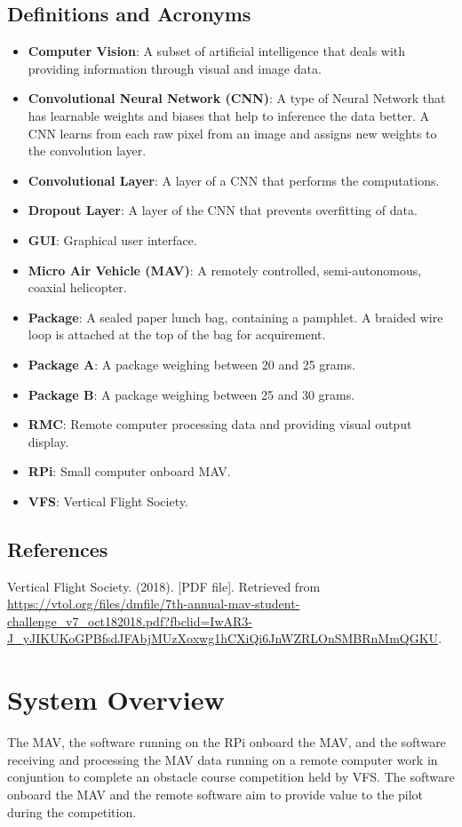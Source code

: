 \documentclass[onecolumn, oneside, letterpaper, draftclsnofoot, 10pt, compsoc]{IEEEtran}
\begin{document}
\subsection{Definitions and Acronyms}
\begin{itemize}
\item \textbf{Computer Vision}: A subset of artificial intelligence that deals with providing information through visual and image data.
\item \textbf{Convolutional Neural Network (CNN)}: A type of Neural Network that has learnable weights and biases that help to inference the data better. A CNN learns from each raw pixel from an image and assigns new weights to the convolution layer.
\item \textbf{Convolutional Layer}: A layer of a CNN that performs the computations.
\item \textbf{Dropout Layer}: A layer of the CNN that prevents overfitting of data.
\item \textbf{GUI}: Graphical user interface.
\item \textbf{Micro Air Vehicle (MAV)}: A remotely controlled, semi-autonomous, coaxial helicopter.
\item \textbf{Package}: A sealed paper lunch bag, containing a pamphlet. A braided wire loop is attached at the top of the bag for acquirement.
\item \textbf{Package A}: A package weighing between 20 and 25 grams.
\item \textbf{Package B}: A package weighing between 25 and 30 grams.
\item \textbf{RMC}: Remote computer processing data and providing visual output display.
\item \textbf{RPi}: Small computer onboard MAV.
\item \textbf{VFS}: Vertical Flight Society.

\end{itemize}

\subsection{References}
\newblock [1]
\newblock Vertical Flight Society. (2018).
 [PDF file].
\newblock Retrieved from \url{ https://vtol.org/files/dmfile/7th-annual-mav-student-challenge\_v7\_oct182018.pdf?fbclid=IwAR3-J\_yJIKUKoGPBfsdJFAbjMUzXoxwg1hCXiQi6JnWZRLOnSMBRnMmQGKU}.

\section{System Overview}
The MAV, the software running on the RPi onboard the MAV, and the software receiving and processing the MAV data running on a remote computer work in conjuntion to complete an obstacle course competition held by VFS. The software onboard the MAV and the remote software aim to provide value to the pilot during the competition.
\end{document}
